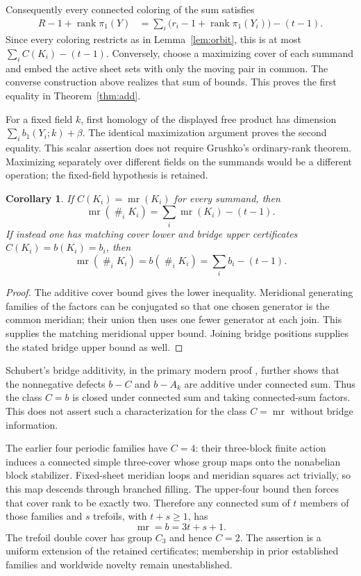 \documentclass[11pt]{article}
\newtheorem{corollary}[theorem]{Corollary}
\newcommand{\mr}{\operatorname{mr}}
\newcommand{\rank}{\operatorname{rank}}
\begin{document}
Consequently every connected coloring of the sum satisfies
\begin{align*}
 R-1+\rank\pi_1(Y)
 &=\sum_i\bigl(r_i-1+\rank\pi_1(Y_i)\bigr)-(t-1).
\end{align*}
Since every coloring restricts as in Lemma~\ref{lem:orbit},
this is at most $\sum_i C(K_i)-(t-1)$.
Conversely, choose a maximizing cover of each summand and
embed the active sheet sets with only the moving pair in
common. The converse construction above realizes that sum
of bounds. This proves the first equality in
Theorem~\ref{thm:add}.

For a fixed field $k$, first homology of the displayed free
product has dimension $\sum_i b_1(Y_i;k)+\beta$.
The identical maximization argument proves the second
equality. This scalar assertion does not require Grushko's
ordinary-rank theorem. Maximizing separately over different
fields on the summands would be a different operation;
the fixed-field hypothesis is retained.

\begin{corollary}\label{cor:sharp}
If $C(K_i)=\mr(K_i)$ for every summand, then
\[
 \mr(\mathop{\#}_i K_i)=\sum_i\mr(K_i)-(t-1).
\]
If instead one has matching cover lower and bridge upper
certificates $C(K_i)=b(K_i)=b_i$, then
\[
 \mr(\mathop{\#}_i K_i)=b(\mathop{\#}_i K_i)
                       =\sum_i b_i-(t-1).
\]
\end{corollary}
\begin{proof}
The additive cover bound gives the lower inequality.
Meridional generating families of the factors can be
conjugated so that one chosen generator is the common
meridian; their union then uses one fewer generator at
each join. This supplies the matching meridional upper
bound. Joining bridge positions supplies the stated
bridge upper bound as well.
\end{proof}

Schubert's bridge additivity, in the primary modern proof
\cite[Theorem 1]{schultens}, further shows that the
nonnegative defects $b-C$ and $b-A_k$ are additive under
connected sum. Thus the class $C=b$ is closed under
connected sum and taking connected-sum factors.
This does not assert such a characterization for the
class $C=\mr$ without bridge information.

The earlier four periodic families have $C=4$: their
three-block finite action induces a connected simple
three-cover whose group maps onto the nonabelian block
stabilizer. Fixed-sheet meridian loops and meridian squares
act trivially, so this map descends through branched filling.
The upper-four bound then forces that cover rank to be exactly two.
Therefore any connected sum of $t$ members of those families
and $s$ trefoils, with $t+s\ge1$, has
\[
                              \mr=b=3t+s+1.
\]
The trefoil double cover has group $C_3$ and hence $C=2$.
The assertion is a uniform extension of the retained
certificates; membership in prior established families and
worldwide novelty remain unestablished.
\end{document}
